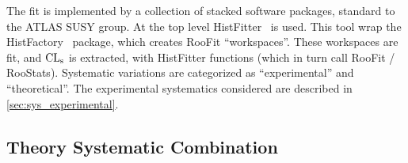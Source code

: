 
The fit is implemented by a collection of stacked software packages,
standard to the ATLAS SUSY group. At the top level
HistFitter~\cite{histfitter} is used. This tool wrap the
HistFactory~\cite{histfactory} package, which creates RooFit
``workspaces''. These workspaces are fit, and $\mathrm{CL}_{\mathrm{s}}$ is extracted, with
HistFitter functions (which in turn call RooFit /
RooStats). Systematic variations are categorized as ``experimental''
and ``theoretical''. The experimental systematics considered are described in \cref{sec:sys_experimental}.

\subsection{Theory Systematic Combination}

